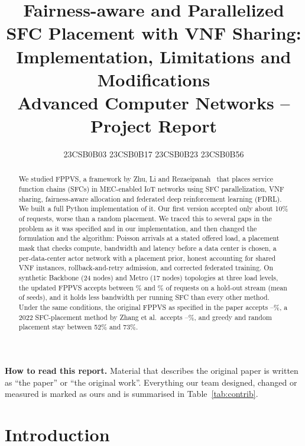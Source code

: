 \documentclass[11pt,a4paper]{article}
\title{\textbf{Fairness-aware and Parallelized SFC Placement with VNF Sharing:\\
Implementation, Limitations and Modifications}\\[4pt]
\large Advanced Computer Networks -- Project Report}
\author{23CSB0B03 \quad 23CSB0B17 \quad 23CSB0B23 \quad 23CSB0B56}
\date{}
\begin{document}
\maketitle

\begin{abstract}
We studied FPPVS, a framework by Zhu, Li and Rezaeipanah~\cite{fppvs} that places
service function chains (SFCs) in MEC-enabled IoT networks using SFC
parallelization, VNF sharing, fairness-aware allocation and federated deep
reinforcement learning (FDRL). We built a full Python implementation of it. Our
first version accepted only about 10\% of requests, worse than a random
placement. We traced this to several gaps in the problem as it was specified
and in our implementation, and then changed the formulation and the algorithm:
Poisson arrivals at a stated offered load, a placement mask that checks compute,
bandwidth and latency before a data center is chosen, a per-data-center actor
network with a placement prior, honest accounting for shared VNF instances,
rollback-and-retry admission, and corrected federated training. On synthetic
Backbone (24 nodes) and Metro (17 nodes) topologies at three load levels, the
updated FPPVS accepts between \fppvsMinAcc\% and \fppvsMaxAcc\% of requests on
a hold-out stream (mean of \numSeeds{} seeds), and it holds less bandwidth per
running SFC than every other method. Under the same conditions, the original
FPPVS as specified in the paper accepts \origMinAcc--\origMaxAcc\%, a 2022
SFC-placement method by Zhang et al.\ accepts \zhangMinAcc--\zhangMaxAcc\%, and
greedy and random placement stay between 52\% and 73\%.
\end{abstract}

\noindent\textbf{How to read this report.} Material that describes the original
paper is written as ``the paper'' or ``the original work''. Everything our team
designed, changed or measured is marked as ours and is summarised in
Table~\ref{tab:contrib}.

\section{Introduction}
\end{document}
